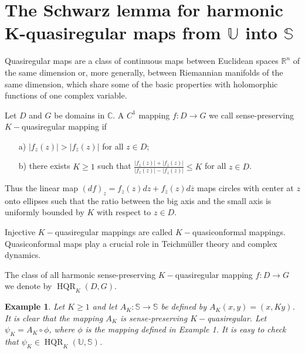\documentclass{amsart}
\newcommand{\HQR}{\mathop{\mathrm{HQR}}}
\newtheorem{example}{Example}
\begin{document}
\section{The Schwarz lemma for harmonic K-quasiregular maps from $\mathbb{U}$ into $\mathbb{S}$}
Quasiregular maps are a class of continuous maps between Euclidean spaces $\mathbb{R}^n$ of the same dimension or, more generally, between Riemannian manifolds of the same dimension, which share some of the basic properties with holomorphic functions of one complex variable.

Let $D$ and $G$ be domains in $\mathbb{C}$. A $C^1$ mapping $f:D\rightarrow G$ we call sense-preserving $K-$quasiregular mapping if
\begin{itemize}
  \item[a)] $|f_z(z)|>|f_{\overline{z}}(z)|$ for all $z\in D$;\\
  \item[b)] there exists $K\geqslant1$ such that $\displaystyle\frac{|f_z(z)|+|f_{\overline{z}}(z)|}{|f_z(z)|-|f_{\overline{z}}(z)|}\leqslant K$ for all $z\in D$.
\end{itemize}

Thus the linear map $(df)_z=f_z(z)dz+f_{\overline{z}}(z)d\overline{z}$  maps circles with center at $z$  onto ellipses such that the ratio  between the big axis and the small axis is uniformly bounded by $K$ with respect to $z\in D$.

Injective  $K-$quasiregular mappings are called  $K-$quasiconformal  mappings.
Quasiconformal maps  play a crucial role in  Teichm\"{u}ller theory and complex dynamics.

The class of all harmonic sense-preserving $K-$quasiregular mapping $f:D\rightarrow G$ we denote by $\HQR_{K}(D,G)$.

\begin{example}\label{exa:psiK}
Let $K\geqslant1$ and let $A_{K}:\mathbb{S}\rightarrow\mathbb{S}$ be defined by $A_{K}(x,y)=(x,Ky)$. It is clear that the mapping $A_{K}$ is sense-preserving $K-$quasiregular. Let $\psi_K=A_{K}\circ\phi$, where $\phi$ is the mapping defined in Example 1. It is easy to check that $\psi_K\in\HQR_{K}(\mathbb{U},\mathbb{S})$.
\end{example}
\end{document}
